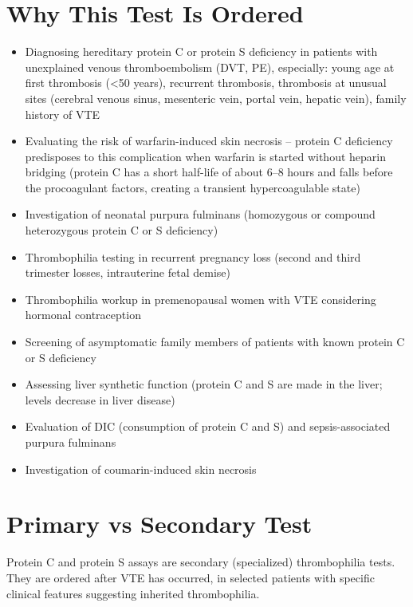 \section*{Why This Test Is Ordered}
\begin{itemize}
  \item Diagnosing hereditary protein C or protein S deficiency in patients with unexplained venous thromboembolism (DVT, PE), especially: young age at first thrombosis (<50 years), recurrent thrombosis, thrombosis at unusual sites (cerebral venous sinus, mesenteric vein, portal vein, hepatic vein), family history of VTE
  \item Evaluating the risk of warfarin-induced skin necrosis -- protein C deficiency predisposes to this complication when warfarin is started without heparin bridging (protein C has a short half-life of about 6--8 hours and falls before the procoagulant factors, creating a transient hypercoagulable state)
  \item Investigation of neonatal purpura fulminans (homozygous or compound heterozygous protein C or S deficiency)
  \item Thrombophilia testing in recurrent pregnancy loss (second and third trimester losses, intrauterine fetal demise)
  \item Thrombophilia workup in premenopausal women with VTE considering hormonal contraception
  \item Screening of asymptomatic family members of patients with known protein C or S deficiency
  \item Assessing liver synthetic function (protein C and S are made in the liver; levels decrease in liver disease)
  \item Evaluation of DIC (consumption of protein C and S) and sepsis-associated purpura fulminans
  \item Investigation of coumarin-induced skin necrosis
\end{itemize}

\section*{Primary vs Secondary Test}
Protein C and protein S assays are secondary (specialized) thrombophilia tests. They are ordered after VTE has occurred, in selected patients with specific clinical features suggesting inherited thrombophilia.

